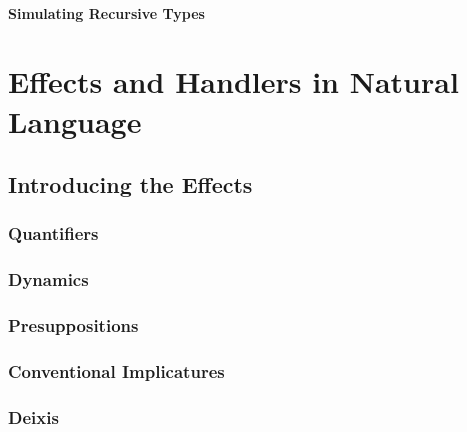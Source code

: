 \documentclass{report}
\begin{document}
\subsection{Simulating Recursive Types}



\part{Effects and Handlers in Natural Language}

\chapter{Introducing the Effects}
\section{Quantifiers}
\section{Dynamics}
\section{Presuppositions}
\section{Conventional Implicatures}
\section{Deixis}





\end{document}
